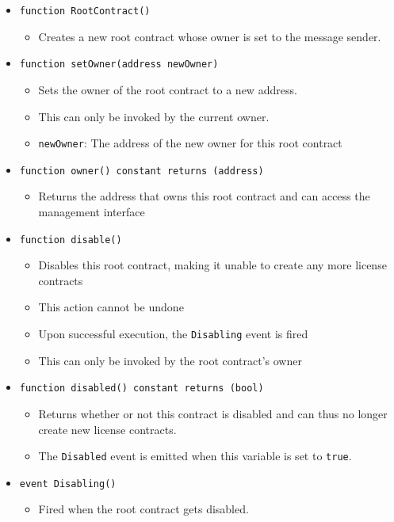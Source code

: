 \documentclass[a4paper]{article}
\begin{document}
\begin{itemize}
  \item \texttt{function RootContract()}
  \begin{itemize}
    \item Creates a new root contract whose owner is set to the message sender.
  \end{itemize}
  
  \item \texttt{function setOwner(address newOwner)}
  \begin{itemize}
    \item Sets the owner of the root contract to a new address.
    \item This can only be invoked by the current owner.
    \item \texttt{newOwner}: The address of the new owner for this root contract
  \end{itemize}
  
  \item \texttt{function owner() constant returns (address)}
  \begin{itemize}
    \item Returns the address that owns this root contract and can access the management interface
  \end{itemize}
  
  \item \texttt{function disable()}
  \begin{itemize}
    \item Disables this root contract, making it unable to create any more license contracts
    \item This action cannot be undone
    \item Upon successful execution, the \texttt{Disabling} event is fired
    \item This can only be invoked by the root contract's owner
  \end{itemize}
  
  \item \texttt{function disabled() constant returns (bool)}
  \begin{itemize}
    \item Returns whether or not this contract is disabled and can thus no longer create new license contracts.
    \item The \texttt{Disabled} event is emitted when this variable is set to \texttt{true}.
  \end{itemize}
  
  \item \texttt{event Disabling()}
  \begin{itemize}
    \item Fired when the root contract gets disabled.
  \end{itemize}
  

\end{itemize}
\end{document}
